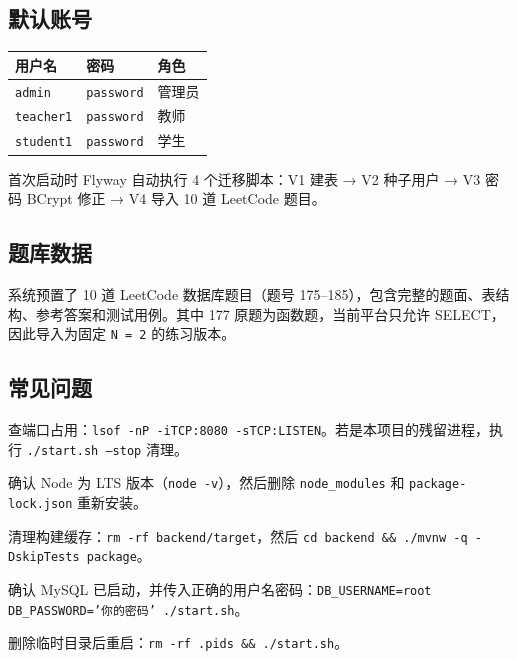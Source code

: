 \documentclass[12pt,a4paper]{ctexart}
\begin{document}
\subsection{默认账号}

\begin{table}[h]
\centering
\begin{tabular}{lll}
\hline
用户名 & 密码 & 角色 \\
\hline
\texttt{admin}    & \texttt{password} & 管理员 \\
\texttt{teacher1} & \texttt{password} & 教师 \\
\texttt{student1} & \texttt{password} & 学生 \\
\hline
\end{tabular}
\end{table}

首次启动时 Flyway 自动执行 4 个迁移脚本：V1 建表 → V2 种子用户 → V3 密码 BCrypt 修正 → V4 导入 10 道 LeetCode 题目。

\subsection{题库数据}

系统预置了 10 道 LeetCode 数据库题目（题号 175--185），包含完整的题面、表结构、参考答案和测试用例。其中 177 原题为函数题，当前平台只允许 SELECT，因此导入为固定 \texttt{N = 2} 的练习版本。

\subsection{常见问题}

\begin{description}[leftmargin=2em,style=nextline]

\item[端口被占用]
查端口占用：\texttt{lsof -nP -iTCP:8080 -sTCP:LISTEN}。若是本项目的残留进程，执行 \texttt{./start.sh --stop} 清理。

\item[前端启动超时]
确认 Node 为 LTS 版本（\texttt{node -v}），然后删除 \texttt{node\_modules} 和 \texttt{package-lock.json} 重新安装。

\item[Maven 打包异常]
清理构建缓存：\texttt{rm -rf backend/target}，然后 \texttt{cd backend \&\& ./mvnw -q -DskipTests package}。

\item[MySQL 连接失败]
确认 MySQL 已启动，并传入正确的用户名密码：\texttt{DB\_USERNAME=root DB\_PASSWORD='你的密码' ./start.sh}。

\item[.pids 目录残留]
删除临时目录后重启：\texttt{rm -rf .pids \&\& ./start.sh}。

\end{description}
\end{document}
